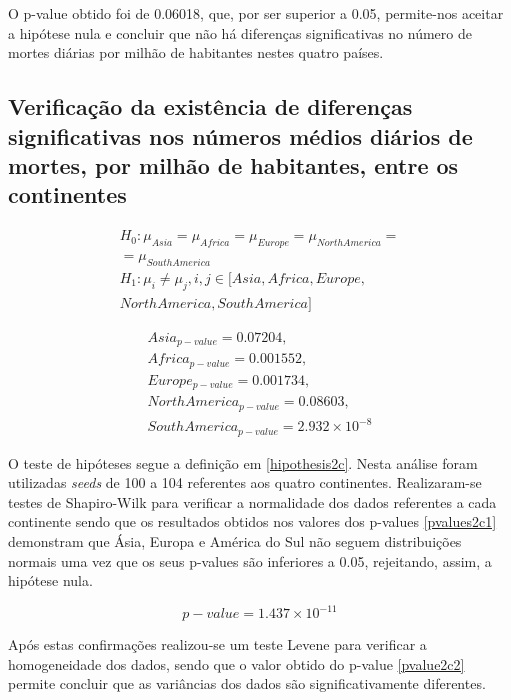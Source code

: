\documentclass[conference]{IEEEtran}
\begin{document}
O p-value obtido foi de 0.06018, que, por ser superior a 0.05, permite-nos aceitar a hipótese nula e concluir que não há diferenças significativas no número de mortes diárias por milhão de habitantes nestes quatro países.


\subsection{Verificação da existência de diferenças significativas nos números médios diários de mortes, por milhão de habitantes, entre os continentes}

\begin{equation}
  \begin{array}{l}
    H_{0}:\mu _{Asia}=\mu _{Africa}=\mu _{Europe}=\mu _{North America}= \\
    = \mu _{South America} \\ 
    H_{1}:\mu _{i}\neq \mu _{j}, i,j\in [Asia, Africa, Europe, \\
    North America, South America]
  \end{array}\label{hipothesis2c}
\end{equation}

\begin{equation}
	\begin{array}{l}
	Asia_{p-value}=0.07204, \\
	Africa_{p-value}=0.001552, \\
	Europe_{p-value}=0.001734, \\
	North America_{p-value}=0.08603, \\
	South America_{p-value}=2.932\times 10^{-8}
	\end{array}\label{pvalues2c1}
\end{equation}

O teste de hipóteses segue a definição em \eqref{hipothesis2c}. Nesta análise foram utilizadas \textit{seeds} de 100 a 104 referentes aos quatro continentes. Realizaram-se testes de Shapiro-Wilk para verificar a normalidade dos dados referentes a cada continente sendo que os resultados obtidos nos valores dos p-values \eqref{pvalues2c1} demonstram que Ásia, Europa e América do Sul não seguem distribuições normais uma vez que os seus p-values são inferiores a 0.05, rejeitando, assim, a hipótese nula.

\begin{equation}
p-value = 1.437\times 10^{-11}\label{pvalue2c2}
\end{equation}

Após estas confirmações realizou-se um teste Levene para verificar a homogeneidade dos dados, sendo que o valor obtido do p-value \eqref{pvalue2c2} permite concluir que as variâncias dos dados são significativamente diferentes.
\end{document}
